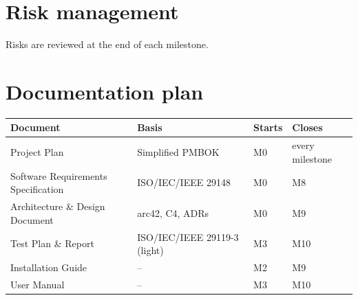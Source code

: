 \documentclass{covermaker}
\begin{document}
\chapter{Risk management}
Risks are reviewed at the end of each milestone.


\chapter{Documentation plan}
\begin{tabularx}{\linewidth}{@{}lYll@{}}
\toprule
\textbf{Document} & \textbf{Basis} & \textbf{Starts} & \textbf{Closes} \\
\midrule
Project Plan & Simplified PMBOK & M0 & every milestone \\
Software Requirements Specification & ISO/IEC/IEEE 29148 & M0 & M8 \\
Architecture \& Design Document & arc42, C4, ADRs & M0 & M9 \\
Test Plan \& Report & ISO/IEC/IEEE 29119-3 (light) & M3 & M10 \\
Installation Guide & -- & M2 & M9 \\
User Manual & -- & M3 & M10 \\
\bottomrule
\end{tabularx}
\end{document}
